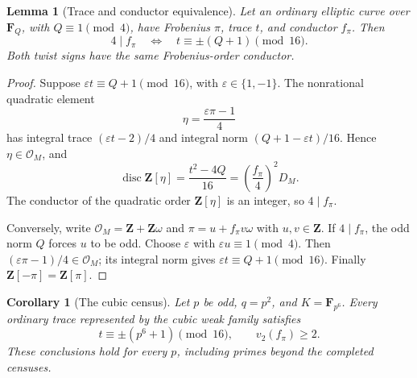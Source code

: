 \documentclass[11pt]{article}
\newtheorem{lemma}[theorem]{Lemma}
\newtheorem{corollary}[theorem]{Corollary}
\newcommand{\F}{\mathbf F}
\newcommand{\Z}{\mathbf Z}
\newcommand{\OK}{\mathcal O_M}
\begin{document}
\begin{lemma}[Trace and conductor equivalence]\label{lem:conductor}
Let an ordinary elliptic curve over $\F_Q$, with $Q\equiv1\pmod4$,
have Frobenius $\pi$, trace $t$, and conductor $f_\pi$. Then
\[
 4\mid f_\pi\quad\Longleftrightarrow\quad
 t\equiv\pm(Q+1)\pmod{16}.
\]
Both twist signs have the same Frobenius-order conductor.
\end{lemma}
\begin{proof}
Suppose $\varepsilon t\equiv Q+1\pmod{16}$, with
$\varepsilon\in\{1,-1\}$. The nonrational quadratic element
\[
 \eta=\frac{\varepsilon\pi-1}{4}
\]
has integral trace $(\varepsilon t-2)/4$ and integral norm
$(Q+1-\varepsilon t)/16$. Hence $\eta\in\OK$, and
\[
 \operatorname{disc}\Z[\eta]
 =\frac{t^2-4Q}{16}
 =\left(\frac{f_\pi}{4}\right)^2D_M.
\]
The conductor of the quadratic order $\Z[\eta]$ is an integer, so
$4\mid f_\pi$.

Conversely, write $\OK=\Z+\Z\omega$ and
$\pi=u+f_\pi v\omega$ with $u,v\in\Z$. If $4\mid f_\pi$,
the odd norm $Q$ forces $u$ to be odd. Choose $\varepsilon$ with
$\varepsilon u\equiv1\pmod4$. Then
$(\varepsilon\pi-1)/4\in\OK$; its integral norm gives
$\varepsilon t\equiv Q+1\pmod{16}$.
Finally $\Z[-\pi]=\Z[\pi]$.
\end{proof}

\begin{corollary}[The cubic census]\label{cor:cubic}
Let $p$ be odd, $q=p^2$, and $K=\F_{p^6}$. Every ordinary trace
represented by the cubic weak family satisfies
\[
 t\equiv\pm(p^6+1)\pmod{16},\qquad v_2(f_\pi)\ge2.
\]
These conclusions hold for every $p$, including primes beyond the
completed censuses.
\end{corollary}
\end{document}
